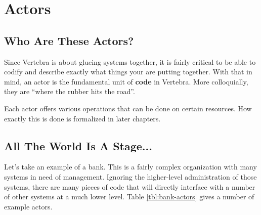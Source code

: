 \newcommand{\actor}{{\sf actor}}
\newcommand{\actors}{{\sf actors}}
\newcommand{\Actor}{{\sf Actor}}
\newcommand{\Actors}{{\sf Actors}}

\section{Actors}

\subsection{Who Are These Actors?}

Since Vertebra is about glueing systems together, it is fairly critical to be able to codify and describe exactly what things your are putting together.  With that in mind, an \actor{} is the fundamental unit of \textbf{code} in Vertebra.  More colloquially, they are ``where the rubber hits the road''.

Each \actor{} offers various operations that can be done on certain resources.  How exactly this is done is formalized in later chapters.

\subsection{All The World Is A Stage...}

Let's take an example of a bank.  This is a fairly complex organization with many systems in need of management.  Ignoring the higher-level administration of those systems, there are many pieces of code that will directly interface with a number of other systems at a much lower level.  Table \ref{tbl:bank-actors} gives a number of example actors.

